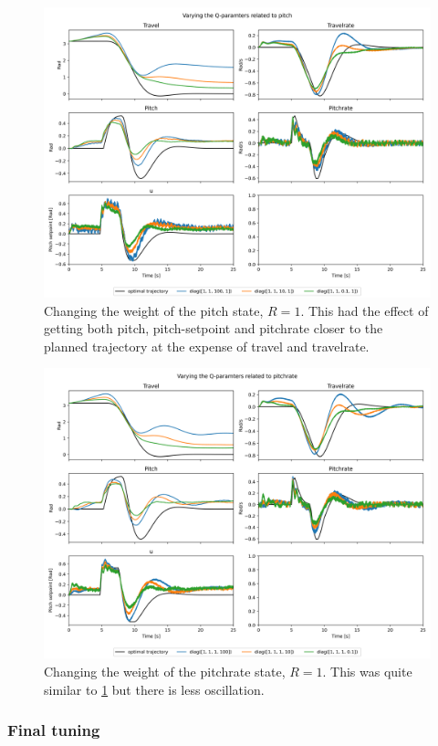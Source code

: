 \documentclass[../main.tex]{subfiles}
\begin{document}
\begin{figure}[h]
	\centering
	\includegraphics[width=0.8\linewidth]{figures/LAB3_Q_variations_pitch.png}
	\caption{Changing the weight of the pitch state, $R=1$. This had the effect of getting both pitch, pitch-setpoint and pitchrate closer to the planned trajectory at the expense of travel and travelrate.}
	\label{fig:LAB3_Q_variations_pitch}
\end{figure}

\begin{figure}[h]
	\centering
	\includegraphics[width=0.8\linewidth]{figures/LAB3_Q_variations_pitchrate.png}
	\caption{Changing the weight of the pitchrate state, $R=1$. This was quite similar to \cref{fig:LAB3_Q_variations_pitch} but there is less oscillation.}
	\label{fig:LAB3_Q_variations_pitchrate}
\end{figure}
\subsubsection{Final tuning}
\end{document}
